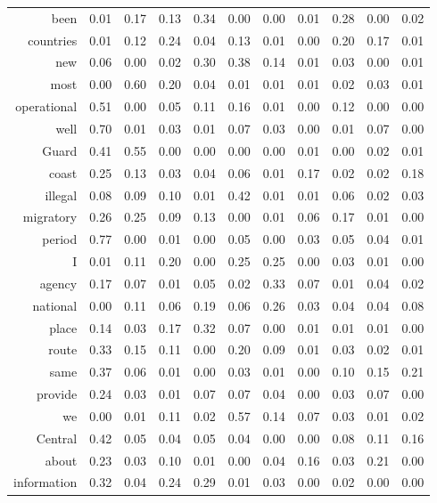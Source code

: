 \begin{longtable}{rrrrrrrrrrr}
  been & 0.01 & 0.17 & 0.13 & 0.34 & 0.00 & 0.00 & 0.01 & 0.28 & 0.00 & 0.02 \\ 
  countries & 0.01 & 0.12 & 0.24 & 0.04 & 0.13 & 0.01 & 0.00 & 0.20 & 0.17 & 0.01 \\ 
  new & 0.06 & 0.00 & 0.02 & 0.30 & 0.38 & 0.14 & 0.01 & 0.03 & 0.00 & 0.01 \\ 
  most & 0.00 & 0.60 & 0.20 & 0.04 & 0.01 & 0.01 & 0.01 & 0.02 & 0.03 & 0.01 \\ 
  operational & 0.51 & 0.00 & 0.05 & 0.11 & 0.16 & 0.01 & 0.00 & 0.12 & 0.00 & 0.00 \\ 
  well & 0.70 & 0.01 & 0.03 & 0.01 & 0.07 & 0.03 & 0.00 & 0.01 & 0.07 & 0.00 \\ 
  Guard & 0.41 & 0.55 & 0.00 & 0.00 & 0.00 & 0.00 & 0.01 & 0.00 & 0.02 & 0.01 \\ 
  coast & 0.25 & 0.13 & 0.03 & 0.04 & 0.06 & 0.01 & 0.17 & 0.02 & 0.02 & 0.18 \\ 
  illegal & 0.08 & 0.09 & 0.10 & 0.01 & 0.42 & 0.01 & 0.01 & 0.06 & 0.02 & 0.03 \\ 
  migratory & 0.26 & 0.25 & 0.09 & 0.13 & 0.00 & 0.01 & 0.06 & 0.17 & 0.01 & 0.00 \\ 
  period & 0.77 & 0.00 & 0.01 & 0.00 & 0.05 & 0.00 & 0.03 & 0.05 & 0.04 & 0.01 \\ 
  I & 0.01 & 0.11 & 0.20 & 0.00 & 0.25 & 0.25 & 0.00 & 0.03 & 0.01 & 0.00 \\ 
  agency & 0.17 & 0.07 & 0.01 & 0.05 & 0.02 & 0.33 & 0.07 & 0.01 & 0.04 & 0.02 \\ 
  national & 0.00 & 0.11 & 0.06 & 0.19 & 0.06 & 0.26 & 0.03 & 0.04 & 0.04 & 0.08 \\ 
  place & 0.14 & 0.03 & 0.17 & 0.32 & 0.07 & 0.00 & 0.01 & 0.01 & 0.01 & 0.00 \\ 
  route & 0.33 & 0.15 & 0.11 & 0.00 & 0.20 & 0.09 & 0.01 & 0.03 & 0.02 & 0.01 \\ 
  same & 0.37 & 0.06 & 0.01 & 0.00 & 0.03 & 0.01 & 0.00 & 0.10 & 0.15 & 0.21 \\ 
  provide & 0.24 & 0.03 & 0.01 & 0.07 & 0.07 & 0.04 & 0.00 & 0.03 & 0.07 & 0.00 \\ 
  we & 0.00 & 0.01 & 0.11 & 0.02 & 0.57 & 0.14 & 0.07 & 0.03 & 0.01 & 0.02 \\ 
  Central & 0.42 & 0.05 & 0.04 & 0.05 & 0.04 & 0.00 & 0.00 & 0.08 & 0.11 & 0.16 \\ 
  about & 0.23 & 0.03 & 0.10 & 0.01 & 0.00 & 0.04 & 0.16 & 0.03 & 0.21 & 0.00 \\ 
  information & 0.32 & 0.04 & 0.24 & 0.29 & 0.01 & 0.03 & 0.00 & 0.02 & 0.00 & 0.00 \\ 

\end{longtable}
